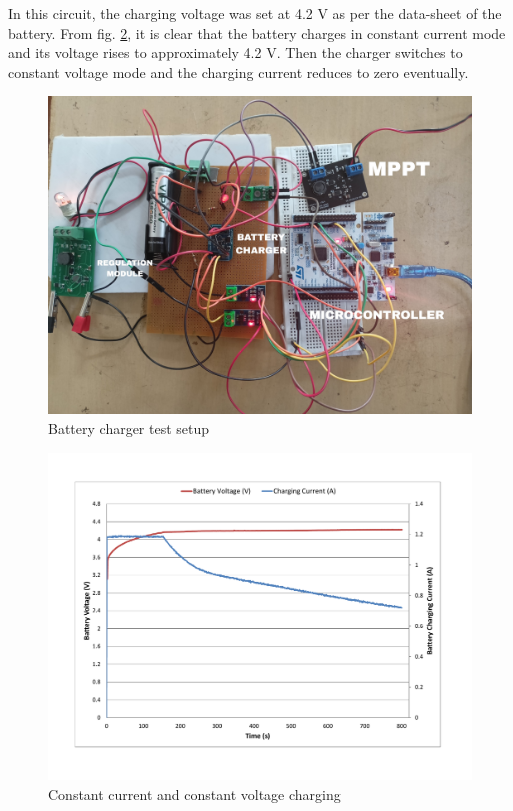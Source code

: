 In this circuit, the charging voltage was set at 4.2 V as per the data-sheet of the battery. From fig. \ref{fig:cccv}, it is clear that the battery charges in constant current mode and its voltage rises to approximately 4.2 V. Then the charger switches to constant voltage mode and the charging current reduces to zero eventually.

\begin{figure}[H]
	\centering
	\includegraphics[width=0.72\columnwidth]{IMGS/TestSetupPics/Bat_cha_test.jpg}
	\caption{Battery charger test setup}
	\label{fig:arch}
\end{figure}

\begin{figure}[H]
	\centering
	\includegraphics[width=0.9\columnwidth]{IMGS/Battery CC CV.pdf}
	\caption{Constant current and constant voltage charging}
	\label{fig:cccv}
\end{figure}

